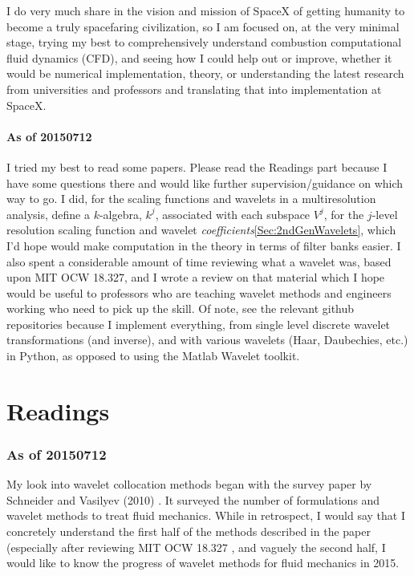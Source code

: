 \documentclass[twoside]{amsart}
\theoremstyle{plain}
\theoremstyle{definition}
\theoremstyle{remark}
\numberwithin{equation}{section}
\begin{document}
I do very much share in the vision and mission of SpaceX of getting humanity to become a truly spacefaring civilization, so I am focused on, at the very minimal stage, trying my best to comprehensively understand combustion computational fluid dynamics (CFD), and seeing how I could help out or improve, whether it would be numerical implementation, theory, or understanding the latest research from universities and professors and translating that into implementation at SpaceX.  

\subsection{As of 20150712}

I tried my best to read some papers.  Please read the Readings part because I have some questions there and would like further supervision/guidance on which way to go.  I did, for the scaling functions and wavelets in a multiresolution analysis, define a $k$-algebra, $k^j$, associated with each subspace $V^j$, for the $j$-level resolution scaling function and wavelet \emph{coefficients}\ref{Sec:2ndGenWavelets}, which I'd hope would make computation in the theory in terms of filter banks easier.  I also spent a considerable amount of time reviewing what a wavelet was, based upon MIT OCW 18.327, and I wrote a review on that material \cite{EYeung2015} which I hope would be useful to professors who are teaching wavelet methods and engineers working who need to pick up the skill.  Of note, see the relevant github repositories because I implement everything, from single level discrete wavelet transformations (and inverse), and with various wavelets (Haar, Daubechies, etc.) in Python, as opposed to using the Matlab Wavelet toolkit.  

\part{Readings}

\section{As of 20150712}

My look into wavelet collocation methods began with the survey paper by Schneider and Vasilyev (2010) \cite{KSchneiderOVasilyev2010}.  It surveyed the number of formulations and wavelet methods to treat fluid mechanics.  While in retrospect, I would say that I concretely understand the first half of the methods described in the paper (especially after reviewing MIT OCW 18.327 \cite{EYeung2015}, and vaguely the second half, I would like to know the progress of wavelet methods for fluid mechanics in 2015. 
\end{document}
